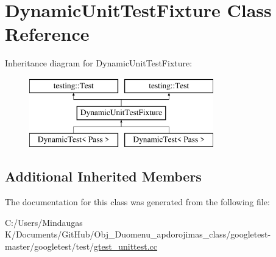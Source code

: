 \hypertarget{class_dynamic_unit_test_fixture}{}\section{Dynamic\+Unit\+Test\+Fixture Class Reference}
\label{class_dynamic_unit_test_fixture}
Inheritance diagram for Dynamic\+Unit\+Test\+Fixture\+:\begin{figure}[H]
\begin{center}
\leavevmode
\includegraphics[height=3.000000cm]{d2/df3/class_dynamic_unit_test_fixture}
\end{center}
\end{figure}
\subsection*{Additional Inherited Members}


The documentation for this class was generated from the following file\+:\begin{DoxyCompactItemize}
\item 
C\+:/\+Users/\+Mindaugas K/\+Documents/\+Git\+Hub/\+Obj\+\_\+\+Duomenu\+\_\+apdorojimas\+\_\+class/googletest-\/master/googletest/test/\mbox{\hyperlink{googletest-master_2googletest_2test_2gtest__unittest_8cc}{gtest\+\_\+unittest.\+cc}}\end{DoxyCompactItemize}
